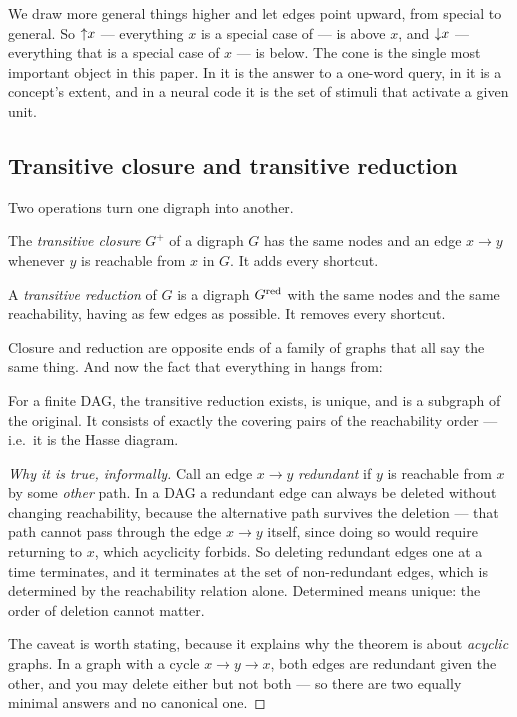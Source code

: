 We draw more general things higher and let edges point upward, from special to
general. So $\mathord{\uparrow}x$ --- everything $x$ is a special case of --- is above $x$,
and $\mathord{\downarrow}x$ --- everything that is a special case of $x$ --- is below.
The cone is the single most important object in this paper. In \odag{} it is
the answer to a one-word query, in \fca{} it is a concept's extent, and in a
neural code it is the set of stimuli that activate a given unit.

\subsection{Transitive closure and transitive reduction}
\label{sec:transitive-reduction}

Two operations turn one digraph into another.

\begin{definition}
The \emph{transitive closure} $G^{+}$ of a digraph $G$ has the same nodes and
an edge $x \to y$ whenever $y$ is reachable from $x$ in $G$. It adds every
shortcut.
\end{definition}

\begin{definition}
A \emph{transitive reduction} of $G$ is a digraph $G^{\mathrm{red}}$ with the same
nodes and the same reachability, having as few edges as possible. It removes
every shortcut.
\end{definition}

Closure and reduction are opposite ends of a family of graphs that all say the
same thing. And now the fact that everything in \odag{} hangs from:

\begin{theorem}
\label{thm:unique-reduction}
For a finite DAG, the transitive reduction exists, is unique, and is a
subgraph of the original. It consists of exactly the covering pairs of the
reachability order --- i.e.\ it is the Hasse diagram.
\end{theorem}

\begin{proof}[Why it is true, informally]
Call an edge $x \to y$ \emph{redundant} if $y$ is reachable from $x$ by some
\emph{other} path. In a DAG a redundant edge can always be deleted without
changing reachability, because the alternative path survives the deletion ---
that path cannot pass through the edge $x \to y$ itself, since doing so would
require returning to $x$, which acyclicity forbids. So deleting redundant
edges one at a time terminates, and it terminates at the set of non-redundant
edges, which is determined by the reachability relation alone. Determined
means unique: the order of deletion cannot matter.

The caveat is worth stating, because it explains why the theorem is about
\emph{acyclic} graphs. In a graph with a cycle $x \to y \to x$, both edges are
redundant given the other, and you may delete either but not both --- so there
are two equally minimal answers and no canonical one.
\end{proof}

